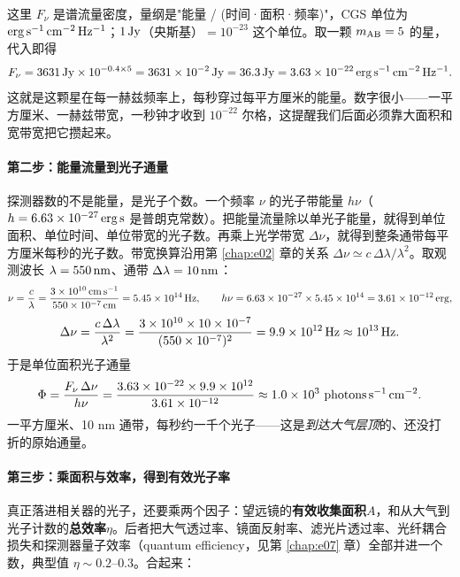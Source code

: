 这里 \(F_\nu\) 是谱流量密度，量纲是"能量 / (时间·面积·频率)"，CGS 单位为 \({\rm erg\,s^{-1}\,cm^{-2}\,Hz^{-1}}\)；\(1\,{\rm Jy}\)（央斯基）\(=10^{-23}\) 这个单位。取一颗 \(m_{\rm AB}=5\) 的星，代入即得
\[
  F_\nu = 3631\,{\rm Jy}\times 10^{-0.4\times5}
        = 3631\times10^{-2}\,{\rm Jy}
        = 36.3\,{\rm Jy}
        = 3.63\times10^{-22}\,{\rm erg\,s^{-1}\,cm^{-2}\,Hz^{-1}} .
\]
这就是这颗星在每一赫兹频率上，每秒穿过每平方厘米的能量。数字很小——一平方厘米、一赫兹带宽，一秒钟才收到 \(10^{-22}\) 尔格，这提醒我们后面必须靠大面积和宽带宽把它攒起来。

\paragraph{第二步：能量流量到光子通量}

探测器数的不是能量，是光子个数。一个频率 \(\nu\) 的光子带能量 \(h\nu\)（\(h=6.63\times10^{-27}\,{\rm erg\,s}\) 是普朗克常数）。把能量流量除以单光子能量，就得到单位面积、单位时间、单位带宽的光子数。再乘上光学带宽 \(\Delta\nu\)，就得到整条通带每平方厘米每秒的光子数。带宽换算沿用第 \ref{chap:e02} 章的关系 \(\Delta\nu\simeq c\,\Delta\lambda/\lambda^2\)。取观测波长 \(\lambda=550\,{\rm nm}\)、通带 \(\Delta\lambda=10\,{\rm nm}\)：
\[
  \nu=\frac{c}{\lambda}=\frac{3\times10^{10}\,{\rm cm\,s^{-1}}}{550\times10^{-7}\,{\rm cm}}
     =5.45\times10^{14}\,{\rm Hz},
  \qquad
  h\nu = 6.63\times10^{-27}\times5.45\times10^{14}
       = 3.61\times10^{-12}\,{\rm erg},
\]
\[
  \Delta\nu = \frac{c\,\Delta\lambda}{\lambda^2}
            = \frac{3\times10^{10}\times10\times10^{-7}}{(550\times10^{-7})^2}
            = 9.9\times10^{12}\,{\rm Hz}\approx10^{13}\,{\rm Hz}.
\]
于是单位面积光子通量
\[
  \Phi = \frac{F_\nu\,\Delta\nu}{h\nu}
       = \frac{3.63\times10^{-22}\times 9.9\times10^{12}}{3.61\times10^{-12}}
       \approx 1.0\times10^{3}\ {\rm photons\,s^{-1}\,cm^{-2}} .
\]
一平方厘米、10 nm 通带，每秒约一千个光子——这是\emph{到达大气层顶}的、还没打折的原始通量。

\paragraph{第三步：乘面积与效率，得到有效光子率}

真正落进相关器的光子，还要乘两个因子：望远镜的\textbf{有效收集面积}\(A\)，和从大气到光子计数的\textbf{总效率}\(\eta\)。后者把大气透过率、镜面反射率、滤光片透过率、光纤耦合损失和探测器量子效率（quantum efficiency，见第 \ref{chap:e07} 章）全部并进一个数，典型值 \(\eta\sim0.2\)--\(0.3\)。合起来：

